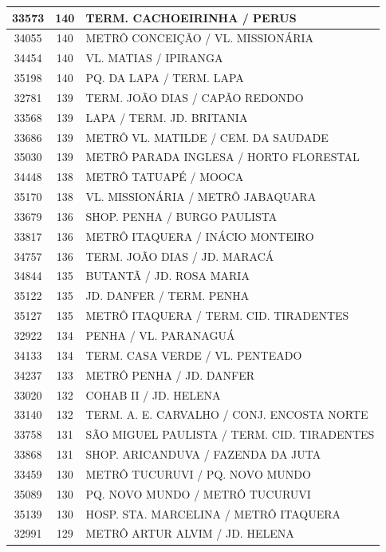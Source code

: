 \documentclass[
	12pt,				%
	oneside,			%
	a4paper,			%
	english,			%
	brazil				%
	]{abntex2ppgsi}
\begin{document}
{{\begin{apendicesenv}
\begin{longtable}{c|c|p{7cm}}
 \hline 
33573 &	140 &	TERM. CACHOEIRINHA / PERUS \\ 
 \hline 
34055 &	140 &	METRÔ CONCEIÇÃO / VL. MISSIONÁRIA \\ 
 \hline 
34454 &	140 &	VL. MATIAS / IPIRANGA \\ 
 \hline 
35198 &	140 &	PQ. DA LAPA / TERM. LAPA \\ 
 \hline 
32781 &	139 &	TERM. JOÃO DIAS / CAPÃO REDONDO \\ 
 \hline 
33568 &	139 &	LAPA / TERM. JD. BRITANIA \\ 
 \hline 
33686 &	139 &	METRÔ VL. MATILDE / CEM. DA SAUDADE \\ 
 \hline 
35030 &	139 &	METRÔ PARADA INGLESA / HORTO FLORESTAL \\ 
 \hline 
34448 &	138 &	METRÔ TATUAPÉ / MOOCA \\ 
 \hline 
35170 &	138 &	VL. MISSIONÁRIA / METRÔ JABAQUARA \\ 
 \hline 
33679 &	136 &	SHOP. PENHA / BURGO PAULISTA \\ 
 \hline 
33817 &	136 &	METRÔ ITAQUERA / INÁCIO MONTEIRO \\ 
 \hline 
34757 &	136 &	TERM. JOÃO DIAS / JD. MARACÁ \\ 
 \hline 
34844 &	135 &	BUTANTÃ / JD. ROSA MARIA \\ 
 \hline 
35122 &	135 &	JD. DANFER / TERM. PENHA \\ 
 \hline 
35127 &	135 &	METRÔ ITAQUERA / TERM. CID. TIRADENTES \\ 
 \hline 
32922 &	134 &	PENHA / VL. PARANAGUÁ \\ 
 \hline 
34133 &	134 &	TERM. CASA VERDE / VL. PENTEADO \\ 
 \hline 
34237 &	133 &	METRÔ PENHA / JD. DANFER \\ 
 \hline 
33020 &	132 &	COHAB II / JD. HELENA \\ 
 \hline 
33140 &	132 &	TERM. A. E. CARVALHO / CONJ. ENCOSTA NORTE \\ 
 \hline 
33758 &	131 &	SÃO MIGUEL PAULISTA / TERM. CID. TIRADENTES \\ 
 \hline 
33868 &	131 &	SHOP. ARICANDUVA / FAZENDA DA JUTA \\ 
 \hline 
33459 &	130 &	METRÔ TUCURUVI / PQ. NOVO MUNDO \\ 
 \hline 
35089 &	130 &	PQ. NOVO MUNDO / METRÔ TUCURUVI \\ 
 \hline 
35139 &	130 &	HOSP. STA. MARCELINA / METRÔ ITAQUERA \\ 
 \hline 
32991 &	129 &	METRÔ ARTUR ALVIM / JD. HELENA \\ 

\end{longtable}
\end{apendicesenv}}}
\end{document}
